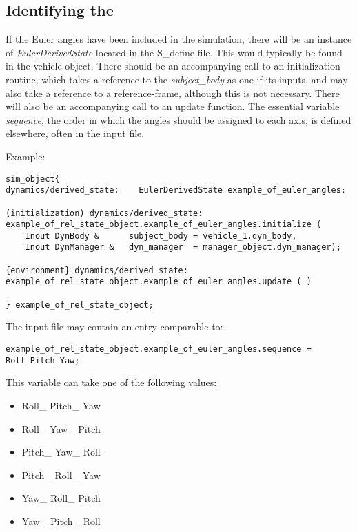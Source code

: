%
%
% 
%


\label{sec:euleruseranalysis}
\subsection{Identifying the \EulerDescT}
If the Euler angles have been included in the simulation, there will be an instance of \textit{EulerDerivedState} located in the S\_define file.  This would typically be found in the vehicle object.  There should be an accompanying call to an initialization routine, which takes a reference to the \textit{subject\_body} as one if its inputs, and may also take a reference to a reference-frame, although this is not necessary.  There will also be an accompanying call to an update function.  The essential variable \textit{sequence}, the order in which the angles should be assigned to each axis, is defined elsewhere, often in the input file.

Example:
\begin{verbatim}
sim_object{
dynamics/derived_state:    EulerDerivedState example_of_euler_angles;

(initialization) dynamics/derived_state:
example_of_rel_state_object.example_of_euler_angles.initialize (
    Inout DynBody &      subject_body = vehicle_1.dyn_body,
    Inout DynManager &   dyn_manager  = manager_object.dyn_manager);
    
{environment} dynamics/derived_state:
example_of_rel_state_object.example_of_euler_angles.update ( )

} example_of_rel_state_object;
\end{verbatim}

The input file may contain an entry comparable to:
\begin{verbatim}
example_of_rel_state_object.example_of_euler_angles.sequence = Roll_Pitch_Yaw;
\end{verbatim}
This variable can take one of the following values:
\begin{itemize}
\item{} Roll\_ Pitch\_ Yaw
\item{} Roll\_ Yaw\_ Pitch
\item{} Pitch\_ Yaw\_ Roll
\item{} Pitch\_ Roll\_ Yaw
\item{} Yaw\_ Roll\_ Pitch
\item{} Yaw\_ Pitch\_ Roll
\end{itemize}

